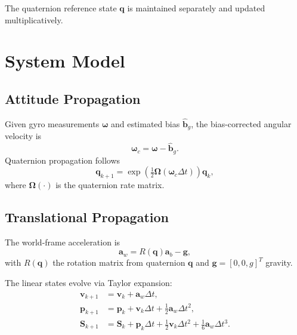 \documentclass[11pt]{article}
\begin{document}
The quaternion reference state $\bm{q}$ is maintained separately and updated multiplicatively.

\section{System Model}

\subsection{Attitude Propagation}
Given gyro measurements $\bm{\omega}$ and estimated bias $\hat{\bm{b}}_g$, the bias-corrected angular velocity is
\[
\bm{\omega}_c = \bm{\omega} - \hat{\bm{b}}_g.
\]
Quaternion propagation follows
\[
\bm{q}_{k+1} = \exp\!\left( \tfrac{1}{2} \bm{\Omega}(\bm{\omega}_c \Delta t) \right) \bm{q}_k,
\]
where $\bm{\Omega}(\cdot)$ is the quaternion rate matrix.

\subsection{Translational Propagation}
The world-frame acceleration is
\[
\bm{a}_w = R(\bm{q}) \bm{a}_b - \bm{g},
\]
with $R(\bm{q})$ the rotation matrix from quaternion $\bm{q}$ and $\bm{g} = [0,0,g]^T$ gravity.

The linear states evolve via Taylor expansion:
\begin{align}
\bm{v}_{k+1} &= \bm{v}_k + \bm{a}_w \Delta t, \\
\bm{p}_{k+1} &= \bm{p}_k + \bm{v}_k \Delta t + \tfrac{1}{2}\bm{a}_w \Delta t^2, \\
\bm{S}_{k+1} &= \bm{S}_k + \bm{p}_k \Delta t + \tfrac{1}{2}\bm{v}_k \Delta t^2 + \tfrac{1}{6}\bm{a}_w \Delta t^3.
\end{align}
\end{document}
